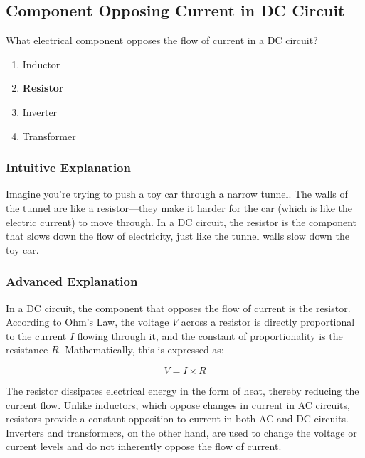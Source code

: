 \subsection{Component Opposing Current in DC Circuit}
\label{T6A01}

\begin{tcolorbox}[colback=gray!10!white,colframe=black!75!black,title=T6A01]
What electrical component opposes the flow of current in a DC circuit?
\begin{enumerate}[label=\Alph*]
    \item Inductor
    \item \textbf{Resistor}
    \item Inverter
    \item Transformer
\end{enumerate}
\end{tcolorbox}

\subsubsection{Intuitive Explanation}
Imagine you're trying to push a toy car through a narrow tunnel. The walls of the tunnel are like a resistor—they make it harder for the car (which is like the electric current) to move through. In a DC circuit, the resistor is the component that slows down the flow of electricity, just like the tunnel walls slow down the toy car.

\subsubsection{Advanced Explanation}
In a DC circuit, the component that opposes the flow of current is the resistor. According to Ohm's Law, the voltage \( V \) across a resistor is directly proportional to the current \( I \) flowing through it, and the constant of proportionality is the resistance \( R \). Mathematically, this is expressed as:

\[
V = I \times R
\]

The resistor dissipates electrical energy in the form of heat, thereby reducing the current flow. Unlike inductors, which oppose changes in current in AC circuits, resistors provide a constant opposition to current in both AC and DC circuits. Inverters and transformers, on the other hand, are used to change the voltage or current levels and do not inherently oppose the flow of current.

